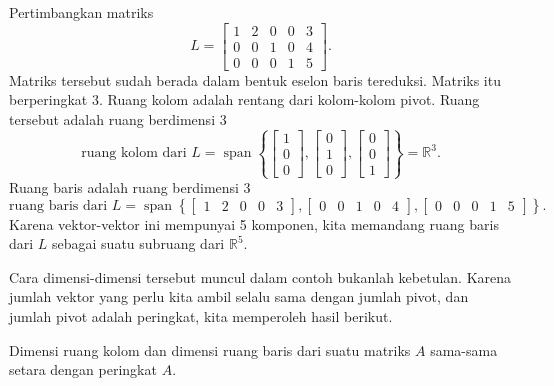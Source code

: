 \begin{example}
Pertimbangkan matriks
\begin{equation*}
L =
\begin{bmatrix}
{1} & 2 & 0 & 0 & 3 \\
0 & 0 & {1} & 0 & 4 \\
0 & 0 & 0 & {1} & 5
\end{bmatrix} .
\end{equation*}
Matriks tersebut sudah berada dalam bentuk eselon baris tereduksi.
Matriks itu berperingkat 3.
Ruang kolom adalah rentang dari kolom-kolom pivot.
Ruang tersebut adalah ruang berdimensi 3
\begin{equation*}
\text{ruang kolom dari $L$} =
\operatorname{span} \left\{
\begin{bmatrix}
1 \\
0 \\
0
\end{bmatrix}
,
\begin{bmatrix}
0 \\
1 \\
0
\end{bmatrix}
,
\begin{bmatrix}
0 \\
0 \\
1
\end{bmatrix}
\right\}
= {\mathbb{R}}^3 .
\end{equation*}
Ruang baris adalah ruang berdimensi 3
\begin{equation*}
\text{ruang baris dari $L$} =
\operatorname{span} \left\{
\begin{bmatrix}
1 & 2 & 0 & 0 & 3
\end{bmatrix}
,
\begin{bmatrix}
0 & 0 & 1 & 0 & 4
\end{bmatrix}
,
\begin{bmatrix}
0 & 0 & 0 & 1 & 5
\end{bmatrix}
\right\} .
\end{equation*}
Karena vektor-vektor ini mempunyai 5 komponen, kita memandang ruang baris dari $L$
sebagai suatu subruang dari ${\mathbb{R}}^5$.
\end{example}

Cara dimensi-dimensi tersebut muncul dalam contoh bukanlah
kebetulan. Karena jumlah vektor yang perlu kita ambil
selalu sama dengan jumlah pivot, dan jumlah pivot
adalah peringkat, kita memperoleh hasil berikut.

\begin{theorem}[Peringkat]
Dimensi ruang kolom dan dimensi ruang baris
dari suatu matriks $A$ sama-sama setara dengan peringkat $A$.
\end{theorem}

